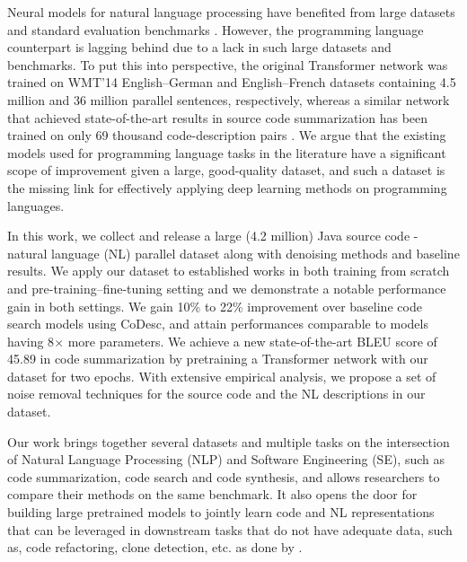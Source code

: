 \documentclass[11pt,a4paper]{article}
\begin{document}
Neural models for natural language processing have benefited from large datasets and standard evaluation benchmarks \cite{glue,superglue,rajpurkar2016squad,hermann2015teaching,common-crawl}. However, the programming language counterpart is lagging behind due to a lack in such large datasets and benchmarks.
To put this into perspective, the original Transformer network \cite{transformer} was trained on WMT'14 English--German and English--French datasets \cite{wmt-14} containing 4.5 million and 36 million parallel sentences, respectively, whereas a similar network that achieved state-of-the-art results in source code summarization has been trained on only 69 thousand code-description pairs \cite{ncs}. We argue that the existing models used for programming language tasks in the literature have a significant scope of improvement given a large, good-quality dataset, and such a dataset is the missing link for effectively applying deep learning methods on programming languages.

In this work, we collect and release a large (4.2 million) Java source code - natural language (NL) parallel dataset along with denoising methods and baseline results.
We apply our dataset to established works in both training from scratch and pre-training--fine-tuning setting and we demonstrate a notable performance gain in both settings. We gain 10\% to 22\% improvement over baseline code search models using CoDesc, and attain performances comparable to models having 8$\times$ more parameters. We achieve a new state-of-the-art BLEU score of 45.89 in code summarization by pretraining a Transformer network with our dataset for two epochs. With extensive empirical analysis, we propose a set of noise removal techniques for the source code and the NL descriptions in our dataset.

Our work brings together several datasets and multiple tasks on the intersection of Natural Language Processing (NLP) and Software Engineering (SE), such as code summarization, code search and code synthesis, and allows researchers to compare their methods on the same benchmark. It also opens the door for building large pretrained models to jointly learn code and NL representations that can be leveraged in downstream tasks  that do not have adequate data, such as, code refactoring, clone detection, etc. as done by \citet{codebert}.





 
\end{document}

